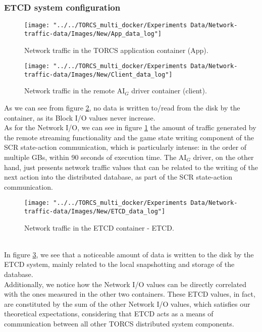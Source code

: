 \subsubsection{ETCD system configuration}
\begin{figure}[h!]
	\centering
	\texttt{[image: "../../TORCS\_multi\_docker/Experiments Data/Network-traffic-data/Images/New/App\_data\_log"]}
	\caption[Network traffic in the TORCS application container - ETCD]{Network traffic in the TORCS application container (App).}
	\label{fig:appdatalog}
\end{figure}
\begin{figure}[h!]
	\centering
	\texttt{[image: "../../TORCS\_multi\_docker/Experiments Data/Network-traffic-data/Images/New/Client\_data\_log"]}
	\caption[Network traffic in the remote AI$_G$ driver container - ETCD]{Network traffic in the remote AI$_G$ driver container (client).}
	\label{fig:clientdatalog}
\end{figure}
As we can see from figure \ref{fig:clientdatalog}, no data is written to/read from the disk by the container, as its Block I/O values never increase. \\
As for the Network I/O, we can see in figure \ref{fig:appdatalog} the amount of traffic generated by the remote streaming functionality and the game state writing component of the SCR state-action communication, which is particularly intense: in the order of multiple GBs, within 90 seconds of execution time. The AI$_G$ driver, on the other hand, just presents network traffic values that can be related to the writing of the next action into the distributed database, as part of the SCR state-action communication.
\begin{figure}[h!]
	\centering
	\texttt{[image: "../../TORCS\_multi\_docker/Experiments Data/Network-traffic-data/Images/New/ETCD\_data\_log"]}
	\caption[Network traffic in the ETCD container]{Network traffic in the ETCD container - ETCD.}
	\label{fig:etcddatalog}
\end{figure}
\\ In figure \ref{fig:etcddatalog}, we see that a noticeable amount of data is written to the disk by the ETCD system, mainly related to the local snapshotting and storage of the database. \\
Additionally, we notice how the Network I/O values can be directly correlated with the ones measured in the other two containers. These ETCD values, in fact, are constituted by the sum of the other Network I/O values, which satisfies our theoretical expectations, considering that ETCD acts as a means of communication between all other TORCS distributed system components.

